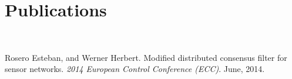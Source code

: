 \chapter*{Publications} \label{publications}

\

Rosero Esteban, and Werner Herbert. Modified distributed consensus filter for sensor networks. \textit{2014 European Control Conference (ECC)}. June, 2014.

\

